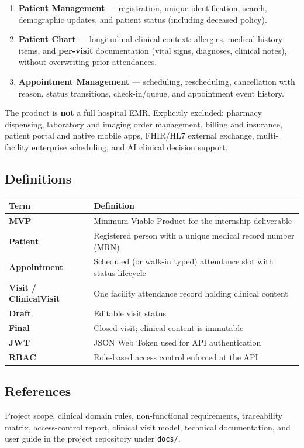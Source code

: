 \documentclass[11pt,a4paper]{article}
\begin{document}
\begin{enumerate}
  \item \textbf{Patient Management} --- registration, unique identification, search, demographic updates, and patient status (including deceased policy).
  \item \textbf{Patient Chart} --- longitudinal clinical context: allergies, medical history items, and \textbf{per-visit} documentation (vital signs, diagnoses, clinical notes), without overwriting prior attendances.
  \item \textbf{Appointment Management} --- scheduling, rescheduling, cancellation with reason, status transitions, check-in/queue, and appointment event history.
\end{enumerate}

The product is \textbf{not} a full hospital EMR. Explicitly excluded: pharmacy dispensing, laboratory and imaging order management, billing and insurance, patient portal and native mobile apps, FHIR/HL7 external exchange, multi-facility enterprise scheduling, and AI clinical decision support.

\subsection{Definitions}
\begin{tabularx}{\textwidth}{@{}>{\bfseries}p{3.2cm}X@{}}
\toprule
Term & Definition \\
\midrule
MVP & Minimum Viable Product for the internship deliverable \\
Patient & Registered person with a unique medical record number (MRN) \\
Appointment & Scheduled (or walk-in typed) attendance slot with status lifecycle \\
Visit / ClinicalVisit & One facility attendance record holding clinical content \\
Draft & Editable visit status \\
Final & Closed visit; clinical content is immutable \\
JWT & JSON Web Token used for API authentication \\
RBAC & Role-based access control enforced at the API \\
\bottomrule
\end{tabularx}

\subsection{References}
Project scope, clinical domain rules, non-functional requirements, traceability matrix, access-control report, clinical visit model, technical documentation, and user guide in the project repository under \texttt{docs/}.
\end{document}
